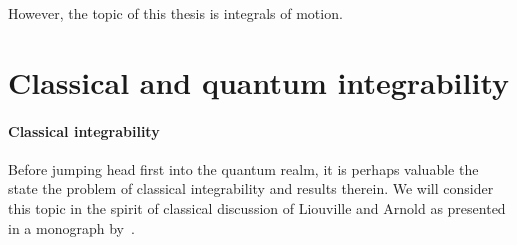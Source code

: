 However, the topic of this thesis is integrals of motion.


\section{Classical and quantum integrability\label{sec:integrability}}

\paragraph{Classical integrability}Before jumping head first into the quantum realm, it is perhaps valuable the state
the problem of classical integrability and results therein.
We will consider this topic in the spirit of classical discussion
of Liouville and Arnold as presented in a monograph by~\textcite{Gutzwiller1991}.

